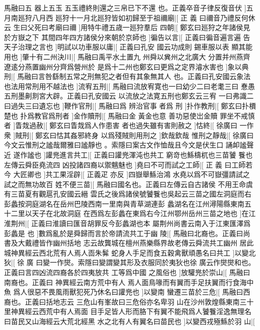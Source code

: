 馬融曰五%
器上五玉%
%
五玉禮終則還之三帛已下不還%
也。正義卒音子律反復音伏%
]五月南廵狩八月西%
%
廵狩十一月北廵狩皆如初歸至于祖禰廟|[%
正%
義%
%
曰禰音乃禮反何休云%
生曰父死曰考廟曰禰%
]用特牛禮五歳一廵狩羣后%
%
四朝|[%
鄭玄曰廵狩之年諸侯見於方嶽之下%
其間四年四方諸侯分來朝於京師也%
]徧告以言|[%
%
正義曰徧音遍言遍%
告天子治理之言也%
]明試以功車服以庸|[%
正義曰孔安%
國云功成則%
%
錫車服以表%
顯其能用也%
]肇十有二州決川|[%
馬融曰禹平水土置九%
州舜以兾州之北廣大%
%
分置并州燕齊遼逺分燕置幽州分齊爲營州於%
是爲十二州也鄭玄曰更爲之定界濬水害也%
]象以典%
%
刑|[%
馬融曰言咎繇制五常之刑無犯之者但有其象無其人%
也。正義曰孔安國云象法也法用常刑用不越法也%
%
]流宥五刑|[%
馬融曰流放宥寛也一曰幼少二曰老耄三曰%
惷愚五刑墨劓剕宮大辟。正義曰孔安國云%
%
以流放之法寛五刑也鄭玄云三宥%
一曰弗識二曰過失三曰遺忘也%
]鞭作官刑|[%
馬融曰爲%
辨治官事%
%
者爲%
刑%
]扑作教刑|[%
鄭玄曰扑檟楚也%
扑爲教官爲刑者%
]金作贖刑|[%
馬融曰金%
黃金也意%
%
善功惡使岀金贖%
罪坐不戒慎者%
]眚烖過赦|[%
鄭玄曰眚烖爲人作患害%
者也過失雖有害則赦之%
%
]怙終|[%
徐廣曰%
一作衆%
]賊刑|[%
鄭玄曰怙其姦邪終身%
以爲殘賊則用刑之%
]欽哉欽哉%
%
惟刑之靜哉|[%
徐廣曰今文云惟刑之謐哉爾雅曰謐靜也%
。索隱曰案古文作恤哉且今文是伏生口%
%
誦卹謐聲近%
遂作謐也%
]讙兠進言共工|[%
正義曰讙兠渾沌也共工%
窮竒也鯀檮杌也三苗饕%
%
餮也左傳云舜臣堯流四%
凶投諸四裔以禦魑魅也%
]堯曰不可而試之工師|[%
正%
義%
%
曰工師若今%
大匠卿也%
]共工果淫辟|[%
正義疋%
亦反%
]四嶽舉鯀治鴻%
%
水堯以爲不可嶽彊請試之試之而無功故百%
%
姓不便三苗|[%
馬融曰國名也。正義曰左傳云自古諸侯%
不用王命虞有三苗夏有觀扈孔安國云縉%
%
雲氏之後爲諸侯號饕餮也吳起云三苗之國左洞庭而右%
彭蠡按洞庭湖名在岳州巴陵西南一里南與青草湖連彭%
%
蠡湖名在江州潯陽縣東南五十二里以天子在北故洞庭%
在西爲左彭蠡在東爲右今江州鄂州岳州三苗之地也%
%
]在江淮荆州|[%
正義曰淮讀曰匯音胡罪反今彭蠡湖也本%
屬荆州尚書云南入于江東匯澤爲彭蠡是%
%
也%
]數爲亂於是舜歸而言於帝請流共工于幽%
%
陵|[%
馬融曰北裔也。正義曰尚書及大戴禮皆作幽州括地%
志云故龔城在檀州燕樂縣界故老傳云舜流共工幽州%
%
居此城神異經云西北荒有人焉人靣朱髴%
蛇身人手足而食五穀禽獸頑愚名曰共工%
]以變北狄|[%
徐%
廣%
%
曰變一作爕。索隱曰變謂變其形及衣服同於夷狄也徐%
廣云作爕爕和也。正義曰言四凶流四裔各於四夷放共%
%
工等爲中國%
之風俗也%
]放驩兠於崇山|[%
馬融曰南裔也。正義曰%
神異經云南方荒中有人%
%
焉人面鳥喙而有翼而手足扶翼而行食海中魚%
爲人很惡不畏風雨獸犯死乃休名曰讙兠也%
]以變南%
%
蠻遷三苗於三危|[%
馬融曰西裔也。正義曰括地志云%
三危山有峯故曰三危俗亦名卑羽%
%
山在沙州敦煌縣東南三十里神異經云西荒中有人焉面%
目手足皆人形而胳下有翼不能飛爲人饕餮淫逸無理名%
%
曰苗民又山海經云大荒北經黑%
水之北有人有翼名曰苗民也%
]以變西戎殛鯀於羽%
%
山|[%
